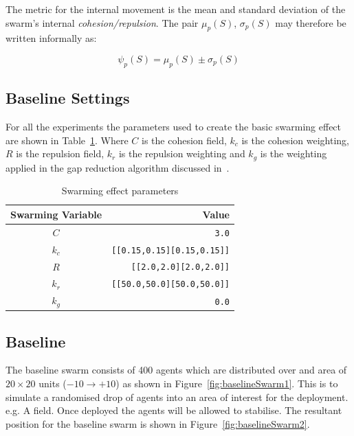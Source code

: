 \documentclass[12pt,a4paper]{IEEEtran}
\newcommand{\kc}{\mathit{k_{c}}}
\newcommand{\kr}{\mathit{k_{r}}}
\newcommand{\kg}{\mathit{k_{g}}}
\newcommand{\rb}{\mathit{R}}
\begin{document}
The metric for the internal movement is the mean and standard deviation of the swarm's internal \emph{cohesion/repulsion}. The pair $\mu_p(S)$, $\sigma_p(S)$ may therefore be written informally as: 

\small
\begin{equation}
\label{eq:SwarmMagnitudeMatric}
\psi_p(S) = \mu_p(S)\pm \sigma_p(S)
\end{equation}
\normalsize

\subsection{Baseline Settings}
For all the experiments the parameters used to create the basic swarming effect are shown in Table~\ref{tab:swarmingEffect}. Where $C$ is the cohesion field, $\kc$ is the cohesion weighting, $\rb$ is the repulsion field, $\kr$ is the repulsion weighting and $\kg$ is the weighting applied in the gap reduction algorithm discussed in~\cite{eliot2019void}. 

\begin{table}[H]
	\centering
	\tiny
	\begin{tabular}{|c|r|}
		\hline
		\rowcolor[HTML]{000000} 
		{\color[HTML]{FFFFFF} Swarming Variable} & {\color[HTML]{FFFFFF} Value} \\ \hline
		$C$ & \texttt{3.0} \\ \hline
		$k_c$ & \texttt{[[0.15,0.15][0.15,0.15]]}  \\ \hline
		$R$ & \texttt{[[2.0,2.0][2.0,2.0]]} \\ \hline
		$k_r$ & \texttt{[[50.0,50.0][50.0,50.0]]} \\ \hline
		$k_g$ & \texttt{0.0} \\ \hline
	\end{tabular}
	\caption{Swarming effect parameters}
	\label{tab:swarmingEffect}
\end{table}

\subsection{Baseline}
The baseline swarm consists of 400 agents which are distributed over and area of $20\times 20$ units ($-10\rightarrow+10$) as shown in Figure~\ref{fig:baselineSwarm1}. This is to simulate a randomised drop of agents into an area of interest for the deployment. e.g. A field. Once deployed the agents will be allowed to stabilise. The resultant position for the baseline swarm is shown in Figure~\ref{fig:baselineSwarm2}. 
\end{document}
